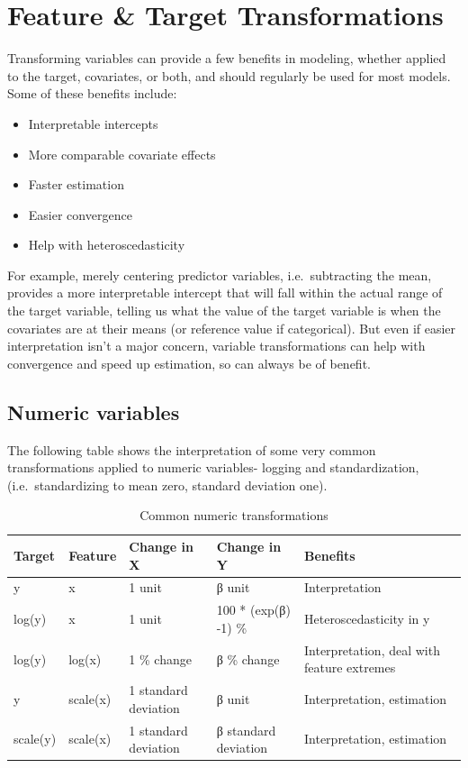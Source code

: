 \documentclass[
  letterpaper,
]{krantz}
\providecommand{\tightlist}{%
  \setlength{\itemsep}{0pt}\setlength{\parskip}{0pt}}\usepackage{longtable,booktabs,array}
\begin{document}
\section{Feature \& Target
Transformations}\label{feature-target-transformations}

Transforming variables can provide a few benefits in modeling, whether
applied to the target, covariates, or both, and should regularly be used
for most models. Some of these benefits include:

\begin{itemize}
\tightlist
\item
  Interpretable intercepts
\item
  More comparable covariate effects
\item
  Faster estimation
\item
  Easier convergence
\item
  Help with heteroscedasticity
\end{itemize}

For example, merely centering predictor variables, i.e.~subtracting the
mean, provides a more interpretable intercept that will fall within the
actual range of the target variable, telling us what the value of the
target variable is when the covariates are at their means (or reference
value if categorical). But even if easier interpretation isn't a major
concern, variable transformations can help with convergence and speed up
estimation, so can always be of benefit.

\subsection{Numeric variables}\label{numeric-variables}

The following table shows the interpretation of some very common
transformations applied to numeric variables- logging and
standardization, (i.e.~standardizing to mean zero, standard deviation
one).

\hypertarget{tbl-transformation}{}
\begin{longtable}{lllll}
\caption{\label{tbl-transformation}Common numeric transformations }\tabularnewline

\toprule
Target & Feature & Change in X & Change in Y & Benefits \\ 
\midrule\addlinespace[2.5pt]
y & x & 1 unit & β unit & Interpretation \\ 
log(y) & x & 1 unit & 100 * (exp(β) -1) \% & Heteroscedasticity in y \\ 
log(y) & log(x) & 1 \% change & β \% change & Interpretation, deal with feature extremes \\ 
y & scale(x) & 1 standard deviation & β unit & Interpretation, estimation \\ 
scale(y) & scale(x) & 1 standard deviation & β standard deviation & Interpretation, estimation \\ 
\bottomrule
\end{longtable}
\end{document}
